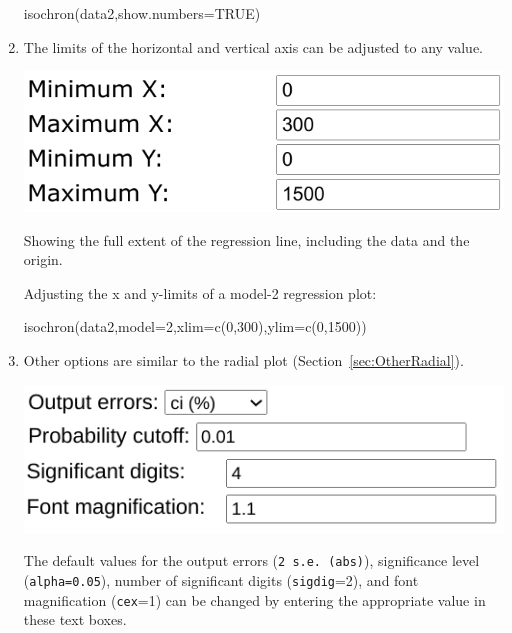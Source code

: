 \begin{refsection}
\begin{enumerate}
\begin{console}
isochron(data2,show.numbers=TRUE)
\end{console}

\item The limits of the horizontal and vertical axis can be adjusted
  to any value.

\noindent\begin{minipage}[t]{.45\linewidth}
  \strut\vspace*{-\baselineskip}\newline
  \includegraphics[width=\linewidth]{../figures/OtherRegressionXYlims.png}
\end{minipage}
\begin{minipage}[t]{.55\linewidth}
Showing the full extent of the regression line, including the data and
the origin.
\end{minipage}

Adjusting the x and y-limits of a model-2 regression plot:

\begin{console}
isochron(data2,model=2,xlim=c(0,300),ylim=c(0,1500))
\end{console}

\item Other options are similar to the radial plot
  (Section~\ref{sec:OtherRadial}).

\noindent\begin{minipage}[t]{.5\linewidth}
  \strut\vspace*{-\baselineskip}\newline
  \includegraphics[width=\linewidth]{../figures/OtherRegressionAlpha.png}
\end{minipage}
\begin{minipage}[t]{.5\linewidth}
  The default values for the output errors (\texttt{2 s.e. (abs)}),
  significance level (\texttt{alpha=0.05}), number of significant
  digits (\texttt{sigdig}=2), and font magnification (\texttt{cex}=1)
  can be changed by entering the appropriate value in these text
  boxes.
\end{minipage}


\end{enumerate}
\end{refsection}
